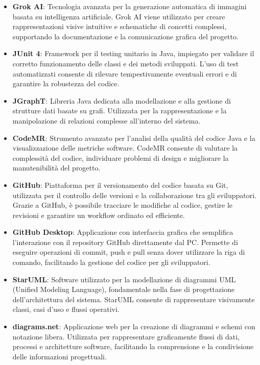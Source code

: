 \begin{itemize}
    \item \textbf{Grok AI}: Tecnologia avanzata per la generazione automatica di immagini basata su intelligenza artificiale. Grok AI viene utilizzato per creare rappresentazioni visive intuitive e schematiche di concetti complessi, supportando la documentazione e la comunicazione grafica del progetto.

    \item \textbf{JUnit 4}: Framework per il testing unitario in Java, impiegato per validare il corretto funzionamento delle classi e dei metodi sviluppati. L’uso di test automatizzati consente di rilevare tempestivamente eventuali errori e di garantire la robustezza del codice.

    \item \textbf{JGraphT}: Libreria Java dedicata alla modellazione e alla gestione di strutture dati basate su grafi. Utilizzata per la rappresentazione e la manipolazione di relazioni complesse all’interno del sistema.

    \item \textbf{CodeMR}: Strumento avanzato per l’analisi della qualità del codice Java e la visualizzazione delle metriche software. CodeMR consente di valutare la complessità del codice, individuare problemi di design e migliorare la manutenibilità del progetto.

    \item \textbf{GitHub}: Piattaforma per il versionamento del codice basata su Git, utilizzata per il controllo delle versioni e la collaborazione tra gli sviluppatori. Grazie a GitHub, è possibile tracciare le modifiche al codice, gestire le revisioni e garantire un workflow ordinato ed efficiente. 

    \item \textbf{GitHub Desktop}: Applicazione con interfaccia grafica che semplifica l’interazione con il repository GitHub direttamente dal PC. Permette di eseguire operazioni di commit, push e pull senza dover utilizzare la riga di comando, facilitando la gestione del codice per gli sviluppatori.

    \item \textbf{StarUML}: Software utilizzato per la modellazione di diagrammi UML (Unified Modeling Language), fondamentale nella fase di progettazione dell'architettura del sistema. StarUML consente di rappresentare visivamente classi, casi d’uso e flussi operativi.

    \item \textbf{diagrams.net}: Applicazione web per la creazione di diagrammi e schemi con notazione libera. Utilizzata per rappresentare graficamente flussi di dati, processi e architetture software, facilitando la comprensione e la condivisione delle informazioni progettuali.


\end{itemize}
